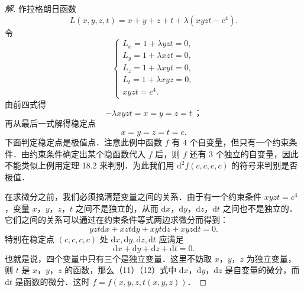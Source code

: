 \begin{proof}[解]
作拉格朗日函数
\[
L(x,y,z,t)=x+y+z+t+\lambda(xyzt-c^{4}).
\]
令
\[
\begin{cases}
L_{x}=1+\lambda yzt=0,\\
L_{y}=1+\lambda xzt=0,\\
L_{z}=1+\lambda xyt=0,\\
L_{t}=1+\lambda xyz=0,\\
xyzt=c^{4}.
\end{cases}
\]
由前四式得
\[
-\lambda xyzt=x=y=z=t\ \text{；}
\]
再从最后一式解得稳定点
\[
x=y=z=t=c.
\]
下面判定稳定点是极值点．注意此例中函数 $f$ 有 $4$ 个自变量，但只有一个约束条件．由约束条件确定出某个隐函数代入 $f$ 后，则 $f$ 还有 $3$ 个独立的自变量，因此不能类似上例用定理 18.2 来判别．为此我们用 $\mathrm{d}^{2}f(c,c,c,c)$ 的符号来判别是否极值．

在求微分之前，我们必须搞清楚变量之间的关系．由于有一个约束条件 $xyzt=c^{4}$，变量 $x$，$y$，$z$，$t$ 之间不是独立的，从而 $\mathrm{d}x$，$\mathrm{d}y$，$\mathrm{d}z$，$\mathrm{d}t$ 之间也不是独立的．它们之间的关系可以通过在约束条件等式两边求微分而得到：
\begin{equation}
yzt\mathrm{d}x+xzt\mathrm{d}y+xyt\mathrm{d}z+xyz\mathrm{d}t=0.
\tag{11}
\end{equation}
特别在稳定点 $(c,c,c,c)$ 处 $\mathrm{d}x,\mathrm{d}y,\mathrm{d}z,\mathrm{d}t$ 应满足
\begin{equation}
\mathrm{d}x+\mathrm{d}y+\mathrm{d}z+\mathrm{d}t=0.
\tag{12}
\end{equation}
也就是说，四个变量中只有三个是独立变量．这里不妨取 $x$，$y$，$z$ 为独立变量，则 $t$ 是 $x$，$y$，$z$ 的函数，那么（11）（12）式中 $\mathrm{d}x$，$\mathrm{d}y$，$\mathrm{d}z$ 是自变量的微分，而 $\mathrm{d}t$ 是函数的微分．这时 $f=f(x,y,z,t(x,y,z))$．


\end{proof}
